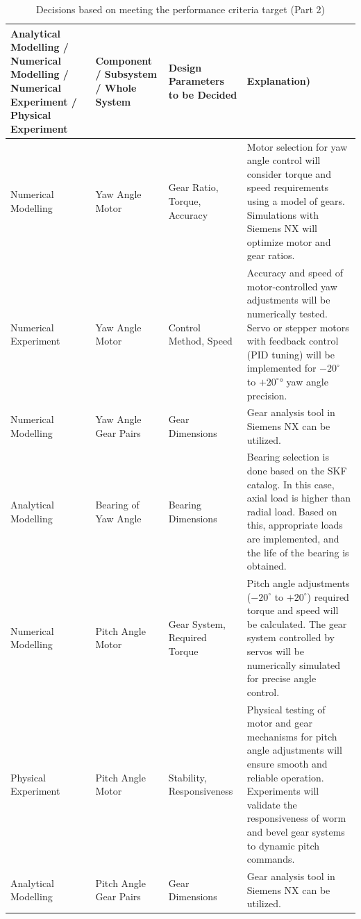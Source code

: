 \documentclass[12pt]{article}
\renewcommand{\arraystretch}{1.2} %
\begin{document}
\begin{table}[H]
\centering
\caption{Decisions based on meeting the performance criteria target (Part 2)}
\scriptsize %
\renewcommand{\arraystretch}{1.5}
\setlength{\tabcolsep}{4pt}
\begin{tabular}{|>{\raggedright\arraybackslash}p{4cm}|>{\raggedright\arraybackslash}p{3cm}|>{\raggedright\arraybackslash}p{3cm}|>{\raggedright\arraybackslash}p{6cm}|}
\hline
\textbf{Analytical Modelling / Numerical Modelling / Numerical Experiment / Physical Experiment} & \textbf{Component / Subsystem / Whole System} & \textbf{Design Parameters to be Decided} & \textbf{Explanation)} \\ \hline
Numerical Modelling & Yaw Angle Motor & Gear Ratio, Torque, Accuracy & Motor selection for yaw angle control will consider torque and speed requirements using a model of gears. Simulations with Siemens NX will optimize motor and gear ratios. \\ \hline
Numerical Experiment & Yaw Angle Motor & Control Method, Speed & Accuracy and speed of motor-controlled yaw adjustments will be numerically tested. Servo or stepper motors with feedback control (PID tuning) will be implemented for $-20^\circ$
 to $+20^\circ$° yaw angle precision. \\ \hline
Numerical Modelling & Yaw Angle Gear Pairs & Gear Dimensions & Gear analysis tool in Siemens NX can be utilized. \\ \hline
Analytical Modelling & Bearing of Yaw Angle & Bearing Dimensions & Bearing selection is done based on the SKF catalog. In this case, axial load is higher than radial load. Based on this, appropriate loads are implemented, and the life of the bearing is obtained. \\ \hline
Numerical Modelling & Pitch Angle Motor & Gear System, Required Torque & Pitch angle adjustments ($-20^\circ$
 to $+20^\circ$) required torque and speed will be calculated. The gear system controlled by servos will be numerically simulated for precise angle control. \\ \hline
Physical Experiment & Pitch Angle Motor & Stability, Responsiveness & Physical testing of motor and gear mechanisms for pitch angle adjustments will ensure smooth and reliable operation. Experiments will validate the responsiveness of worm and bevel gear systems to dynamic pitch commands. \\ \hline
Analytical Modelling & Pitch Angle Gear Pairs & Gear Dimensions & Gear analysis tool in Siemens NX can be utilized. \\ \hline
\end{tabular}
\label{tab:performance_criteria}
\end{table}
\end{document}
